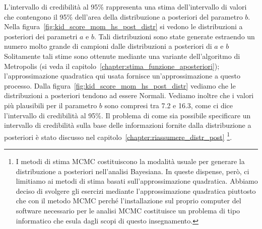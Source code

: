 L'intervallo di credibilità al 95\% rappresenta una stima dell'intervallo di valori che contengono il 95\% dell'area della distribuzione a posteriori del parametro $b$.
Nella figura~\ref{fig:kid_score_mom_hs_post_distr} si vedono le distribuzioni a posteriori dei parametri $a$ e $b$.
Tali distribuzioni sono state generate estraendo un numero molto grande di campioni dalle distribuzioni a posteriori di $a$ e $b$
Solitamente tali stime sono ottenute mediante una variante dell'algoritmo di Metropolis (si veda il capitolo~\ref{chapter:stima_funzione_aposteriori});
l'approssimazione quadratica qui usata fornisce un'approssimazione a questo processo.
Dalla figura~\ref{fig:kid_score_mom_hs_post_distr} vediamo che le distribuzioni a posteriori tendono ad essere Normali.
Vediamo inoltre che i valori più plausibili per il parametro $b$ sono compresi tra 7.2 e 16.3, come ci dice l'intervallo di credibilità al 95\%. 
Il problema di come sia possibile specificare un intervallo di credibilità sulla base delle informazioni fornite dalla distribuzione a posteriori è stato discusso nel capitolo~\ref{chapter:riassumere_distr_post}
\footnote{
I metodi di stima MCMC costituiscono la modalità usuale per generare la distribuzione a posteriori nell'analisi Bayesiana.
In queste dispense, però, ci limitiamo ai metodi di stima basati sull'approssimazione quadratica.
Abbiamo deciso di svolgere gli esercizi mediante l'approssimazione quadratica piuttosto che con il metodo MCMC perché l'installazione sul proprio computer del software necessario per le analisi MCMC costituisce un problema di tipo informatico che esula dagli scopi di questo insegnamento.
}.



